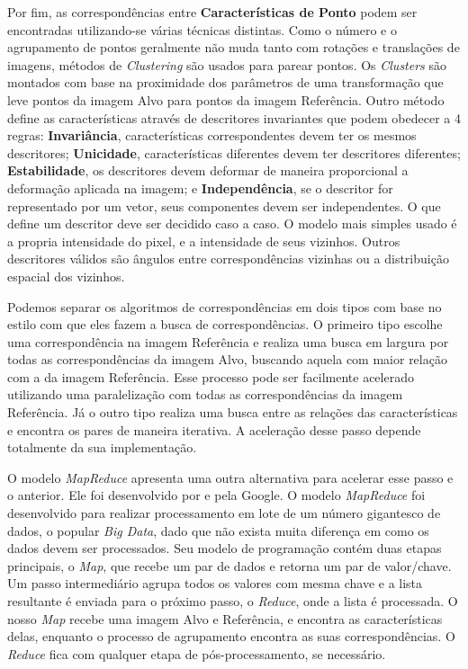     Por fim, as correspondências entre \textbf{Características de Ponto} podem ser encontradas utilizando-se várias técnicas
distintas. Como o número e o agrupamento de pontos geralmente não muda tanto com rotações e translações de imagens, métodos de 
\textit{Clustering} são usados para parear pontos. Os \textit{Clusters} são montados com base na proximidade dos parâmetros
de uma transformação que leve pontos da imagem Alvo para pontos da imagem Referência. Outro método define as características
através de descritores invariantes que podem obedecer a 4 regras: \textbf{Invariância}, características correspondentes 
devem ter os mesmos descritores; \textbf{Unicidade}, características diferentes devem ter descritores diferentes; 
\textbf{Estabilidade}, os descritores devem deformar de maneira proporcional a deformação aplicada na imagem; e 
\textbf{Independência}, se o descritor for representado por um vetor, seus componentes devem ser independentes. 
O que define um descritor deve ser decidido caso a caso. O modelo mais simples usado é a propria intensidade do pixel, 
e a intensidade de seus vizinhos. Outros descritores válidos são ângulos entre correspondências vizinhas ou a distribuição
espacial dos vizinhos.

    Podemos separar os algoritmos de correspondências em dois tipos com base no estilo com que eles fazem a busca de 
correspondências. O primeiro tipo escolhe uma correspondência na imagem Referência e realiza uma busca em largura por
todas as correspondências da imagem Alvo, buscando aquela com maior relação com a da imagem Referência. Esse processo
pode ser facilmente acelerado utilizando uma paralelização com todas as correspondências da imagem Referência. Já o outro
tipo realiza uma busca entre as relações das características e encontra os pares de maneira iterativa. A aceleração
desse passo depende totalmente da sua implementação.

    O modelo \textit{MapReduce} apresenta uma outra alternativa para acelerar esse passo e o anterior. Ele foi 
desenvolvido por \cite{dean2008mapreduce} e pela Google. O modelo \textit{MapReduce} foi desenvolvido para realizar 
processamento em lote de um número gigantesco de dados, o popular \textit{Big Data}, dado que não exista muita diferença 
em como os dados devem ser processados. Seu modelo de programação contém duas etapas principais, o \textit{Map}, que 
recebe um par de dados e retorna um par de valor/chave. Um passo intermediário agrupa todos os valores com mesma chave e
a lista resultante é enviada para o próximo passo, o \textit{Reduce}, onde a lista é processada. O nosso \textit{Map} 
recebe uma imagem Alvo e Referência, e encontra as características delas, enquanto o processo de agrupamento encontra as
suas correspondências. O \textit{Reduce} fica com qualquer etapa de pós-processamento, se necessário.
